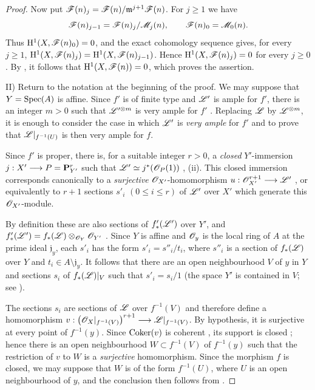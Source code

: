 \begin{proof}
Now put $\mathscr{F}(n)_j
=
\mathscr{F}(n)/\mathfrak m^{j+1}\mathscr{F}(n)$.
For $j\geq1$ we have
\[
  \mathscr{F}(n)_{j-1}
  =
  \mathscr{F}(n)_j/\mathscr{M}_j(n),
  \qquad
  \mathscr{F}(n)_0=\mathscr{M}_0(n).
\]
Thus $\mathrm{H}^1(X,\mathscr{F}(n)_0)=0$, and the exact cohomology sequence
gives, for every $j\geq1$, $\mathrm{H}^1(X,\mathscr{F}(n)_j)
=
\mathrm{H}^1(X,\mathscr{F}(n)_{j-1})$.
Hence $\mathrm{H}^1(X,\mathscr{F}(n)_j)=0$ for every $j\geq0$.  By
, it follows that $\mathrm{H}^1(X,\mathscr{F}(n))=0$,
which proves the assertion.


\noindent II) Return to the notation at the beginning of
the proof.  We may suppose that $Y=\operatorname{Spec}(A)$ is affine.  Since
$f'$ is of finite type and $\mathscr{L}'$ is ample for $f'$, there is an
integer $m>0$ such that $\mathscr{L}'^{\otimes m}$ is very ample for
$f'$ .  Replacing $\mathscr{L}$ by
$\mathscr{L}^{\otimes m}$, it is enough to consider the case in which
$\mathscr{L}'$ is \emph{very ample} for $f'$ and to prove that
$\mathscr{L}|_{f^{-1}(U)}$ is then very ample for $f$.

Since $f'$ is proper, there is, for a suitable integer $r>0$, a
\emph{closed} $Y'$-immersion $j:X'\longrightarrow P=\mathbf{P}_{Y'}^r$
such that $\mathscr{L}'\simeq j^*(\mathscr{O}_P(1))$
, (ii).  This closed immersion corresponds
canonically to a \emph{surjective} $\mathscr{O}_{X'}$-homomorphism $u:\mathscr{O}_{X'}^{r+1}\longrightarrow\mathscr{L}'$
, or equivalently  to
$r+1$ sections $s'_i$ $(0\leq i\leq r)$ of $\mathscr{L}'$ over $X'$
which generate this $\mathscr{O}_{X'}$-module.

By definition these are also sections of $f'_*(\mathscr{L}')$ over
$Y'$, and $f'_*(\mathscr{L}')
=
f_*(\mathscr{L})\otimes_{\mathscr{O}_Y}\mathscr{O}_{Y'}$
.  Since $Y$ is affine and $\mathscr{O}_y$ is the
local ring of $A$ at the prime ideal $\mathfrak j_y$, each $s'_i$
has the form $s'_i=s''_i/t_i$,
where $s''_i$ is a section of $f_*(\mathscr{L})$ over $Y$ and
$t_i\in A\setminus\mathfrak j_y$.  It follows that there are an
open neighbourhood $V$ of $y$ in $Y$ and sections $s_i$ of
$f_*(\mathscr{L})|_V$ such that $s'_i=s_i/1$ (the space $Y'$ is
contained in $V$; see ).

The sections $s_i$ are sections of $\mathscr{L}$ over $f^{-1}(V)$ and
therefore define a homomorphism $v:
\bigl(\mathscr{O}_X|_{f^{-1}(V)}\bigr)^{r+1}
\longrightarrow
\mathscr{L}|_{f^{-1}(V)}$.
By hypothesis, it is surjective at every point of $f^{-1}(y)$.
Since $\operatorname{Coker}(v)$ is coherent , its support is
closed ; hence there is an open neighbourhood
$W\subset f^{-1}(V)$ of $f^{-1}(y)$ such that the restriction of $v$ to $W$
is a \emph{surjective} homomorphism.
Since the morphism $f$ is closed, we may suppose that $W$ is of the form
$f^{-1}(U)$, where $U$ is an open neighbourhood of $y$, and the conclusion
then follows from .
\end{proof}


